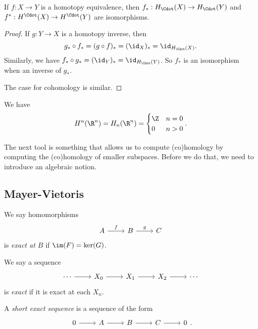 \documentclass[a4paper]{article}
\begin{document}
\begin{cor}
  If $f: X \to Y$ is a homotopy equivalence, then $f_*: H_{\Cdot}(X) \to H_{\Cdot}(Y)$ and $f^*: H^{\Cdot}(X) \to H^{\Cdot}(Y)$ are isomorphisms.
\end{cor}

\begin{proof}
  If $g: Y \to X$ is a homotopy inverse, then
  \[
    g_* \circ f_* = (g \circ f)_* = (\id_X)_* = \id_{H_{\Cdot}(X)}.
  \]
  Similarly, we have $f_* \circ g_* = (\id_Y)_* = \id_{H_{\Cdot}(Y)}$. So $f_*$ is an isomorphism when an inverse of $g_*$.

  The case for cohomology is similar.
\end{proof}

\begin{eg}
  We have
  \[
    H^n(\R^n) = H_n(\R^n) =
    \begin{cases}
      \Z & n = 0\\
      0 & n > 0
    \end{cases}.
  \]
\end{eg}

The next tool is something that allows us to compute (co)homology by computing the (co)homology of smaller subspaces. Before we do that, we need to introduce an algebraic notion.

\subsection{Mayer-Vietoris}
\begin{defi}
  We say homomorphisms
  \[
    \begin{tikzcd}
      A \ar[r, "f"] & B \ar[r, "g"] & C
    \end{tikzcd}
  \]
  is \emph{exact at $B$} if $\im(F) = \ker(G)$.

  We say a sequence
  \[
    \begin{tikzcd}
      \cdots \ar[r] & X_0 \ar[r] & X_1 \ar[r] & X_2 \ar[r] & \cdots
    \end{tikzcd}
  \]
  is \emph{exact} if it is exact at each $X_n$.
\end{defi}

\begin{defi}
  A \emph{short exact sequence} is a sequence of the form
  \[
    \begin{tikzcd}
      0 \ar[r] & A \ar[r] & B \ar[r] & C \ar[r] & 0
    \end{tikzcd}.
  \]
\end{defi}
\end{document}

